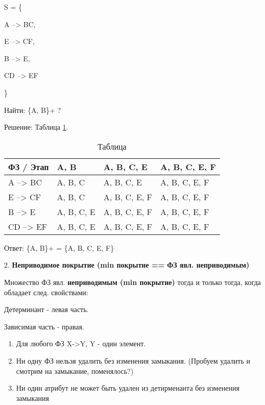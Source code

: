S = \{

A --> BC,

E --> CF,

B --> E,

CD --> EF

\}

Найти: \{A, B\}+ ?

Решение: Таблица \ref{fig:ref12}.


\begin{table}[ht]
	\centering
	\begin{tabular}{ | l | l | l | l |}
		\hline
		ФЗ / Этап & A, B       & A, B, C, E    & A, B, C, E, F \\  \hline
		A --> BC  & A, B, C    & A, B, C, E    & A, B, C, E, F \\ \hline
		E --> CF  & A, B, C    & A, B, C, E, F & A, B, C, E, F \\ \hline
		B --> E   & A, B, C, E & A, B, C, E, F & A, B, C, E, F \\ \hline
		CD --> EF & A, B, C, E & A, B, C, E, F & A, B, C, E, F \\ \hline
		\hline
	\end{tabular}
	\caption{Таблица}
	\label{fig:ref12}
\end{table}

Ответ: \{A, B\}+ = \{A, B, C, E, F\}



2. \textbf{Неприводимое покрытие (min покрытие == ФЗ явл. неприводимым)}

Множество ФЗ явл. \textbf{неприводимым (min покрытие)} тогда и только тогда,
когда обладает след. свойствами:

Детерминант - левая часть.

Зависимая часть - правая.

\begin{enumerate}
	\item Для любого ФЗ X->Y, Y - один элемент.
	\item Ни одну ФЗ нельзя удалить без изменения замыкания. (Пробуем удалить и смотрим на замыкание, поменялось?)
	\item Ни один атрибут не может быть удален из детирменанта без изменения замыкания
\end{enumerate}

